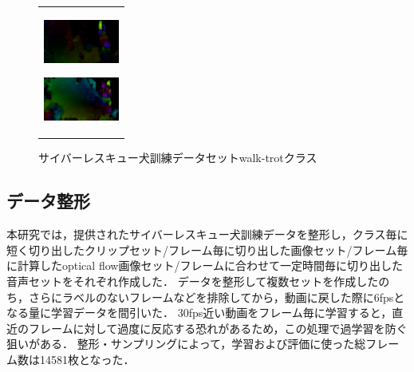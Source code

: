 \begin{figure}[H]
\begin{tabular}{l}
\begin{minipage}{0.165\hsize}
        \begin{center}
          \includegraphics[clip, width=2.5cm]{./Figures/optic_walk4.eps}
          \hspace{0.1cm} { }
        \end{center}
      \end{minipage}
      \begin{minipage}{0.165\hsize}
        \begin{center}
          \includegraphics[clip, width=2.5cm]{./Figures/optic_walk5.eps}
          \hspace{2.2cm} { }
        \end{center}
      \end{minipage}
\\ %
    \end{tabular}
    \caption{サイバーレスキュー犬訓練データセットwalk-trotクラス}
    \label{walk-trot}
\end{figure}


\subsection{データ整形}
本研究では，提供されたサイバーレスキュー犬訓練データを整形し，クラス毎に短く切り出したクリップセット/フレーム毎に切り出した画像セット/フレーム毎に計算したoptical flow画像セット/フレームに合わせて一定時間毎に切り出した音声セットをそれぞれ作成した．
データを整形して複数セットを作成したのち，さらにラベルのないフレームなどを排除してから，動画に戻した際に6fpsとなる量に学習データを間引いた．
30fps近い動画をフレーム毎に学習すると，直近のフレームに対して過度に反応する恐れがあるため，この処理で過学習を防ぐ狙いがある．
整形・サンプリングによって，学習および評価に使った総フレーム数は14581枚となった．
